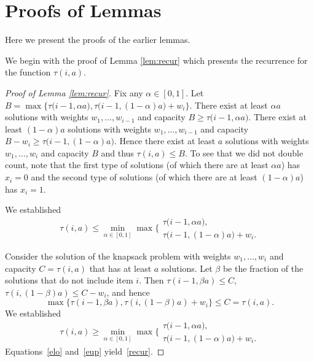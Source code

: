 \documentclass[11pt]{article}
\begin{document}
\section{Proofs of Lemmas}
\label{sec:proofs}

Here we present the proofs of the earlier lemmas.

We begin with the proof of Lemma \ref{lem:recur} which presents the
recurrence for the function $\tau(i,a)$.

\begin{proof}[Proof of Lemma \ref{lem:recur}]
Fix any $\alpha\in [0,1]$. Let $B=\max\{\tau\big(i-1,\alpha
a),\tau\big(i-1,(1-\alpha)a\big) + w_i\}$. There exist at least
$\alpha a$ solutions with weights $w_1,\dots,w_{i-1}$ and capacity
$B\geq \tau\big(i-1,\alpha a)$. There exist at least $(1-\alpha)a$
solutions with weights $w_1,\dots,w_{i-1}$ and capacity $B-w_i\geq
\tau\big(i-1,(1-\alpha) a)$. Hence there exist at least $a$
solutions with weights $w_1,\dots,w_i$ and capacity $B$ and thus
$\tau(i,a)\leq B$. To see that we did not double count, note
that the first type of solutions (of which
there are at least $\alpha a$) has $x_i=0$ and the second type of
solutions (of which there are at least $(1-\alpha)a$) has $x_i=1$.

We established
\begin{equation}\label{elo}
\tau(i,a)\leq \min_{\alpha\in [0,1]}
\max\Bigg\{\begin{array}{l}
  \tau\big(i-1,\alpha a),\\
  \tau\big(i-1,(1-\alpha)a\big) + w_i.
\end{array}
\end{equation}

Consider the solution of the knapsack problem with weights $w_1,\dots,w_i$ and capacity $C=\tau(i,a)$
that has at least $a$ solutions. Let $\beta$ be the fraction of the solutions that do
not include item $i$. Then $\tau(i-1,\beta a)\leq C$, $\tau(i,(1-\beta)a)\leq C-w_i$, and
hence
$$
\max\{\tau(i-1,\beta a),\tau(i,(1-\beta)a)+w_i\}\leq C =
\tau(i,a).
$$
We established
\begin{equation}\label{eup}
\tau(i,a)\geq \min_{\alpha\in [0,1]}
\max\Bigg\{\begin{array}{l}
  \tau\big(i-1,\alpha a),\\
  \tau\big(i-1,(1-\alpha)a\big) + w_i.
\end{array}
\end{equation}
Equations~\eqref{elo} and~\eqref{eup} yield~\eqref{recur}.
\end{proof}
\end{document}
